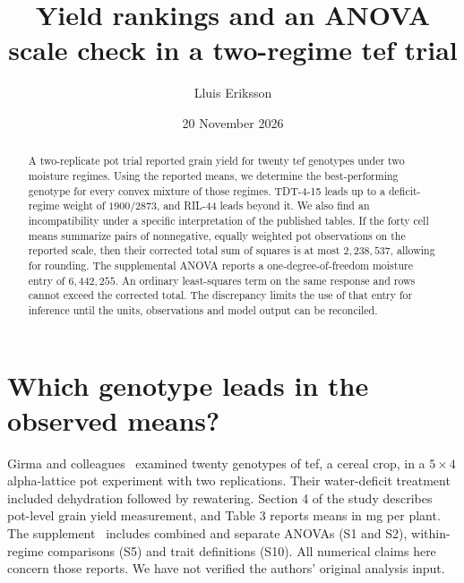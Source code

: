 \documentclass[11pt]{article}
\title{Yield rankings and an ANOVA scale check in a two-regime tef trial}
\author{Lluis Eriksson}
\date{20 November 2026}
\begin{document}
\maketitle
\begin{abstract}
A two-replicate pot trial reported grain yield for twenty tef genotypes under two moisture regimes. Using the reported means, we determine the best-performing genotype for every convex mixture of those regimes. TDT-4-15 leads up to a deficit-regime weight of $1900/2873$, and RIL-44 leads beyond it. We also find an incompatibility under a specific interpretation of the published tables. If the forty cell means summarize pairs of nonnegative, equally weighted pot observations on the reported scale, then their corrected total sum of squares is at most $2{,}238{,}537$, allowing for rounding. The supplemental ANOVA reports a one-degree-of-freedom moisture entry of $6{,}442{,}255$. An ordinary least-squares term on the same response and rows cannot exceed the corrected total. The discrepancy limits the use of that entry for inference until the units, observations and model output can be reconciled.
\end{abstract}
\section{Which genotype leads in the observed means?}
Girma and colleagues~\cite{study} examined twenty genotypes of tef, a cereal crop, in a $5\times4$ alpha-lattice pot experiment with two replications. Their water-deficit treatment included dehydration followed by rewatering. Section 4 of the study describes pot-level grain yield measurement, and Table 3 reports means in mg per plant. The supplement~\cite{sup} includes combined and separate ANOVAs (S1 and S2), within-regime comparisons (S5) and trait definitions (S10). All numerical claims here concern those reports. We have not verified the authors' original analysis input.
\end{document}
